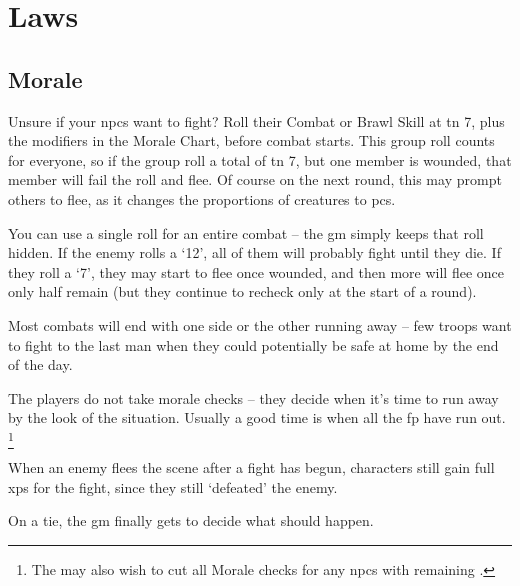\chapter[House of Law]{Laws}

\section{Morale}
\label{morale}
\begin{multicols}{2}

\noindent
Unsure if your \glspl{npc} want to fight?
Roll their Combat or Brawl Skill at \gls{tn} 7, plus the modifiers in the Morale Chart, before combat starts.
This group roll counts for everyone, so if the group roll a total of \gls{tn} 7, but one member is wounded, that member will fail the roll and flee.
Of course on the next round, this may prompt others to flee, as it changes the proportions of creatures to \glspl{pc}.

You can use a single roll for an entire combat -- the \gls{gm} simply keeps that roll hidden.
If the enemy rolls a `12', all of them will probably fight until they die.
If they roll a `7', they may start to flee once wounded, and then more will flee once only half remain (but they continue to recheck only at the start of a round).

Most combats will end with one side or the other running away -- few troops want to fight to the last man when they could potentially be safe at home by the end of the day.

The players do not take morale checks -- they decide when it's time to run away by the look of the situation.
Usually a good time is when all the \gls{fp} have run out.
\footnote{The  may also wish to cut all Morale checks for any \glspl{npc} with remaining .}

When an enemy flees the scene after a fight has begun, characters still gain full \glspl{xp} for the fight, since they still `defeated' the enemy.

On a tie, the \gls{gm} finally gets to decide what should happen.

\end{multicols}

\moralechart

